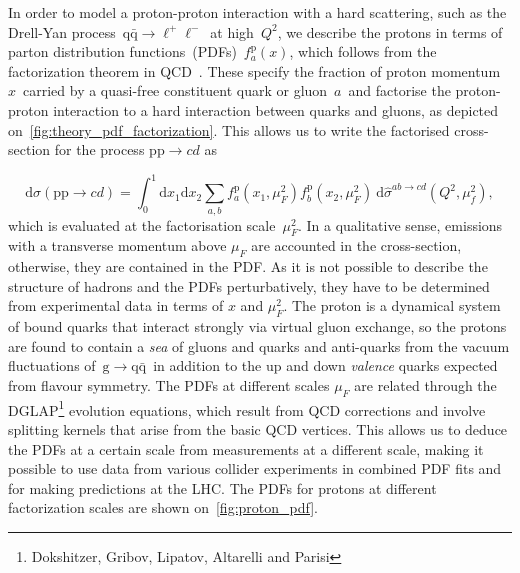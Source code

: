 In order to model a proton-proton interaction with a hard scattering, such as the Drell-Yan process~$\mathrm{q} \bar{\mathrm{q}} \rightarrow \ell^+ \ell^-$~at high~$Q^2$, we describe the protons in terms of parton distribution functions~(PDFs)~$f_a^{\mathrm{p}}(x)$, which follows from the factorization theorem in QCD~\cite{collins1989perturbative}. These specify the fraction of proton momentum~$x$~carried by a quasi-free constituent quark or gluon~$a$~and factorise the proton-proton interaction to a hard interaction between quarks and gluons, as depicted on~\cref{fig:theory_pdf_factorization}. This allows us to write the factorised cross-section for the process $\mathrm{p} \mathrm{p} \rightarrow cd$ as

\begin{equation}
\label{eq:theory_pdf_factorization}
\mathrm{d}\sigma(\mathrm{p}\mathrm{p} \rightarrow cd) = \int_0^1 \mathrm{d}x_1 \mathrm{d}x_2 \sum_{a,b} f_a^{\mathrm{p}}(x_1, \mu_F^2) f_b^{\mathrm{p}}(x_2, \mu_F^2)\ \mathrm{d}\hat{\sigma}^{ab \rightarrow cd} (Q^2, \mu_f^2),
\end{equation}
which is evaluated at the factorisation scale~$\mu_F^2$. In a qualitative sense, emissions with a transverse momentum above $\mu_F$ are accounted in the cross-section, otherwise, they are contained in the PDF. As it is not possible to describe the structure of hadrons and the PDFs perturbatively, they have to be determined from experimental data in terms of $x$ and $\mu_F^2$. The proton is a dynamical system of bound quarks that interact strongly via virtual gluon exchange, so the protons are found to contain a \textit{sea} of gluons and quarks and anti-quarks from the vacuum fluctuations of~$\mathrm{g} \rightarrow \mathrm{q} \bar{\mathrm{q}}$~in addition to the up and down \textit{valence} quarks expected from flavour symmetry. The PDFs at different scales $\mu_F$ are related through the DGLAP\footnote{Dokshitzer, Gribov, Lipatov, Altarelli and Parisi} evolution equations, which result from QCD corrections and involve splitting kernels that arise from the basic QCD vertices. This allows us to deduce the PDFs at a certain scale from measurements at a different scale, making it possible to use data from various collider experiments in combined PDF fits and for making predictions at the LHC. The PDFs for protons at different factorization scales are shown on~\cref{fig:proton_pdf}.

